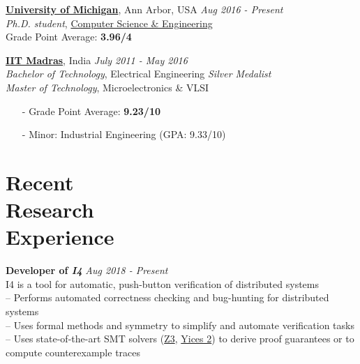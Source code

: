 \documentclass[margin,line,letter]{resume}
\begin{document}
\begin{resume}
    \href{http://www.umich.edu}{\textbf{University of Michigan}}, Ann Arbor, USA \hfill \emph{Aug 2016 - Present} \\ 
    \phantom{x}\hspace{3ex} \emph{Ph.D. student}, \href{http://www.cse.umich.edu}{Computer Science \& Engineering} \\
    \phantom{x}\hspace{3ex} Grade Point Average: \textbf{3.96/4}

    \vspace{-0.2cm}
    \href{http://www.iitm.ac.in}{\textbf{IIT Madras}}, India \hfill \emph{July 2011 - May 2016} \\ 
    \phantom{xx}\hspace{3ex} \emph{Bachelor of Technology}, Electrical Engineering \hfill \textit{Silver Medalist} \\
    \phantom{xx}\hspace{3ex} \emph{Master of Technology}, Microelectronics \& VLSI
    
    \vspace{-0.2cm}
    \begin{itemize}[leftmargin=1.25cm]
        \item[-] Grade Point Average: \textbf{9.23/10}
        \item[-] Minor: Industrial Engineering (GPA: 9.33/10)
    \end{itemize}

    
\section{\mysidestyle Recent\\Research\\Experience}
    \hspace{-2em} \href{https://github.com/GLaDOS-Michigan/I4}{\faGithub} \hspace{0.3em}
    \textbf{Developer of \textit{I4}} \hfill \emph{Aug 2018 - Present}\\
    \phantom{xx}\hspace{1ex} I4 is a tool for automatic, push-button verification of distributed systems \\
    \phantom{xx}\hspace{1ex} -- Performs automated correctness checking and bug-hunting for distributed systems \\
    \phantom{xx}\hspace{1ex} -- Uses formal methods and symmetry to simplify and automate verification tasks \\
    \phantom{xx}\hspace{1ex} -- Uses state-of-the-art SMT solvers (\href{https://github.com/Z3Prover/z3}{Z3}, \href{https://github.com/SRI-CSL/yices2}{Yices 2}) to derive proof guarantees or to \\ \phantom{xx}\hspace{3ex} compute counterexample traces


\end{resume}
\end{document}
